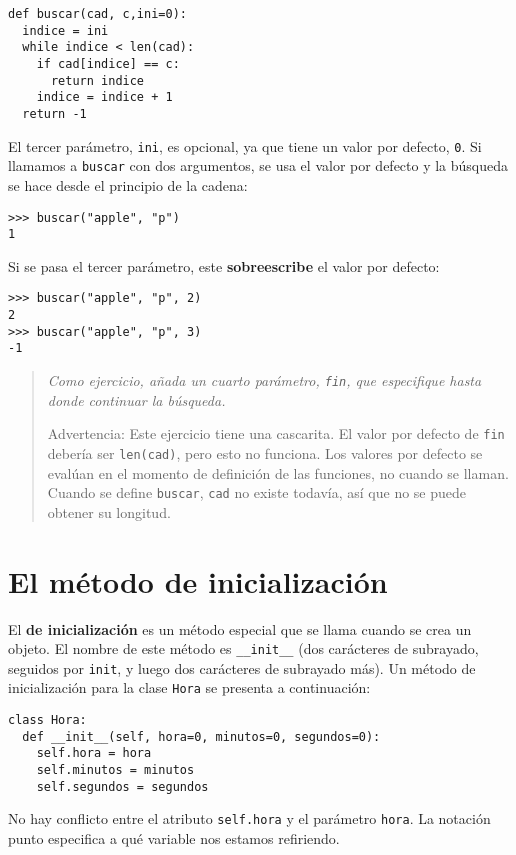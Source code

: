 \beforeverb
\begin{verbatim}
def buscar(cad, c,ini=0):
  indice = ini
  while indice < len(cad):
    if cad[indice] == c:
      return indice
    indice = indice + 1
  return -1
\end{verbatim}
\afterverb
%
El tercer parámetro, \texttt{ini}, es opcional, ya que tiene un
valor por defecto, \texttt{0}. Si llamamos a  \texttt{buscar} con
dos argumentos, se usa el valor por defecto y la búsqueda 
se hace desde el principio de la cadena:

\beforeverb
\begin{verbatim}
>>> buscar("apple", "p")
1
\end{verbatim}
\afterverb
%
Si se pasa el tercer parámetro, este {\bf sobreescribe} el valor
por defecto:

\beforeverb
\begin{verbatim}
>>> buscar("apple", "p", 2)
2
>>> buscar("apple", "p", 3)
-1
\end{verbatim}
\afterverb
%
\begin{quote}
{\em Como ejercicio, añada un cuarto parámetro, \texttt{fin}, que especifique
hasta donde continuar la búsqueda.

Advertencia: Este ejercicio tiene una cascarita. El valor por defecto de
\texttt{fin} debería ser \texttt{len(cad)}, pero esto no funciona.  Los
valores por defecto se evalúan en el momento de definición de las funciones, 
no cuando se llaman. Cuando se define \texttt{buscar}, \texttt{cad} no 
existe todavía, así que no se puede obtener su longitud.}
\end{quote}


\section{El método de inicialización}

El {\bf de inicialización} es un método especial que se llama
cuando se crea un objeto. El nombre de este método es \texttt{\_\_init\_\_} (dos
carácteres de subrayado, seguidos por \texttt{init}, y luego dos carácteres de subrayado más). 
Un método de inicialización para la clase  \texttt{Hora} se
presenta a continuación:

\beforeverb
\begin{verbatim}
class Hora:
  def __init__(self, hora=0, minutos=0, segundos=0):
    self.hora = hora
    self.minutos = minutos
    self.segundos = segundos
\end{verbatim}
\afterverb
%
No hay conflicto entre el  atributo \texttt{self.hora} y
el parámetro \texttt{hora}.  La notación punto especifica
a qué variable nos estamos refiriendo.

